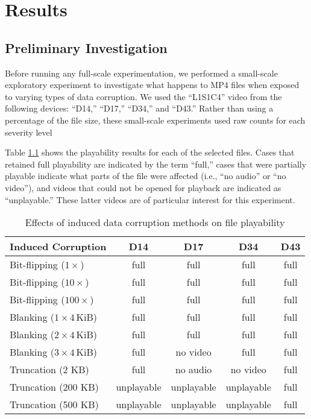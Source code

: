 \chapter{Results}
\label{cha:results}

\section{Preliminary Investigation}

Before running any full-scale experimentation, we performed a small-scale exploratory experiment to investigate what happens to MP4 files when exposed to varying types of data corruption. We used the ``L1S1C4'' video from the following devices: ``D14,'' ``D17,'' ``D34,'' and ``D43.'' Rather than using a percentage of the file size, these small-scale experiments used raw counts for each severity level

Table \ref{tab:corruption-playability} shows the playability results for each of the selected files. Cases that retained full playability are indicated by the term ``full,'' cases that were partially playable indicate what parts of the file were affected (i.e., ``no audio'' or ``no video''), and videos that could not be opened for playback are indicated as ``unplayable.'' These latter videos are of particular interest for this experiment.

\begin{table}
    \centering
    \begin{tabular}{|l||c|c|c|c|}
        \hline
        \textbf{Induced Corruption} & \textbf{D14} & \textbf{D17} & \textbf{D34} & \textbf{D43} \\
        \hline \hline
        Bit-flipping ($1 \times$) & full & full & full & full \\
        Bit-flipping ($10 \times$) & full & full & full & full \\
        Bit-flipping ($100 \times$) & full & full & full & full \\
        \hline
        Blanking ($1\times 4\,\mathrm{KiB}$) & full & full & full & full \\
        Blanking ($2\times 4\,\mathrm{KiB}$) & full & full & full & full \\
        Blanking ($3\times 4\,\mathrm{KiB}$) & full & no video & full & full \\
        \hline
        Truncation (2 KB) & full & no audio & no video & full \\
        Truncation (200 KB) & unplayable & unplayable & unplayable & full \\
        Truncation (500 KB) & unplayable & unplayable & unplayable & full \\
        \hline
    \end{tabular}
    \caption{Effects of induced data corruption methods on file playability}
    \label{tab:corruption-playability}
\end{table}

